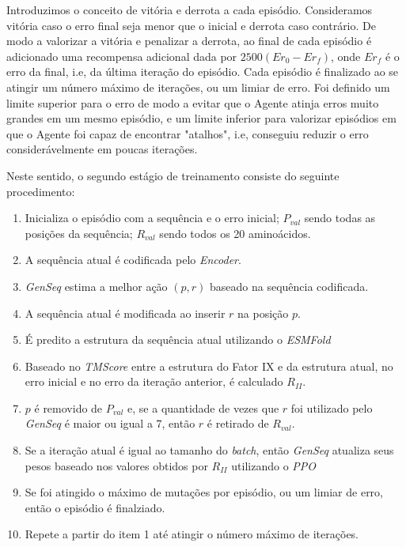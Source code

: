 Introduzimos o conceito de vitória e derrota a cada episódio. 
Consideramos vitória caso o erro final seja menor que o inicial e derrota caso contrário. 
De modo a valorizar a vitória e penalizar a derrota, ao final de cada episódio é adicionado uma recompensa adicional dada por $2500(Er_{0} - Er_{f})$, 
onde $Er_{f}$ é o erro da final, i.e, da última iteração do episódio. Cada episódio é finalizado ao se atingir um número máximo de iterações, ou um limiar de erro. 
Foi definido um limite superior para o erro de modo a evitar que o Agente atinja erros muito grandes em um mesmo episódio,
e um limite inferior para valorizar episódios em que o Agente foi capaz de encontrar "atalhos", i.e, conseguiu reduzir o erro considerávelmente em poucas iterações.

Neste sentido, o segundo estágio de treinamento consiste do seguinte procedimento:

\begin{enumerate}
  \item Inicializa o episódio com a sequência e o erro inicial; $P_{val}$ sendo todas as posições da sequência; $R_{val}$ sendo todos os 20 aminoácidos.
  \item A sequência atual é codificada pelo \textit{Encoder}.
  \item \textit{GenSeq} estima a melhor ação $(p,r)$ baseado na sequência codificada. 
  \item A sequência atual é modificada ao inserir $r$ na posição $p$.
  \item É predito a estrutura da sequência atual utilizando o \textit{ESMFold}
  \item Baseado no \textit{TMScore} entre a estrutura do Fator IX e da estrutura atual, no erro inicial e no erro da iteração anterior, é calculado $R_{II}$.
  \item $p$ é removido de $P_{val}$ e, se a quantidade de vezes que $r$ foi utilizado pelo \textit{GenSeq} é maior ou igual a 7, então $r$ é retirado de $R_{val}$.
  \item Se a iteração atual é igual ao tamanho do \textit{batch}, então \textit{GenSeq} atualiza seus pesos baseado nos valores obtidos por $R_{II}$ utilizando o \textit{PPO}
  \item Se foi atingido o máximo de mutações por episódio, ou um limiar de erro, então o episódio é finalziado.
  \item Repete a partir do item 1 até atingir o número máximo de iterações. 
\end{enumerate}

